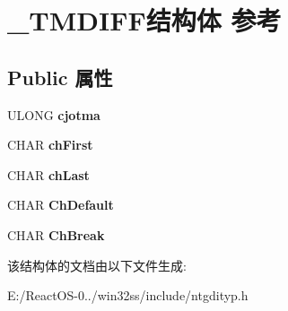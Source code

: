 \hypertarget{struct___t_m_d_i_f_f}{}\section{\+\_\+\+T\+M\+D\+I\+F\+F结构体 参考}
\label{struct___t_m_d_i_f_f}
\subsection*{Public 属性}
\begin{DoxyCompactItemize}
\item 
\mbox{\label{struct___t_m_d_i_f_f_aba7bbd490f62af9c5bcf4eea18253c96}} 
U\+L\+O\+NG {\bfseries cjotma}
\item 
\mbox{\label{struct___t_m_d_i_f_f_a97c81b517df72eb2f44242678dfe5777}} 
C\+H\+AR {\bfseries ch\+First}
\item 
\mbox{\label{struct___t_m_d_i_f_f_ab4f3cbb0ac32868c262723b1289363b2}} 
C\+H\+AR {\bfseries ch\+Last}
\item 
\mbox{\label{struct___t_m_d_i_f_f_aca7f67c2094ac0047903aeb2d2c1c2ab}} 
C\+H\+AR {\bfseries Ch\+Default}
\item 
\mbox{\label{struct___t_m_d_i_f_f_a8c1b1ea7667464da825896af7029932a}} 
C\+H\+AR {\bfseries Ch\+Break}
\end{DoxyCompactItemize}


该结构体的文档由以下文件生成\+:\begin{DoxyCompactItemize}
\item 
E\+:/\+React\+O\+S-\/0../win32ss/include/ntgdityp.\+h\end{DoxyCompactItemize}
